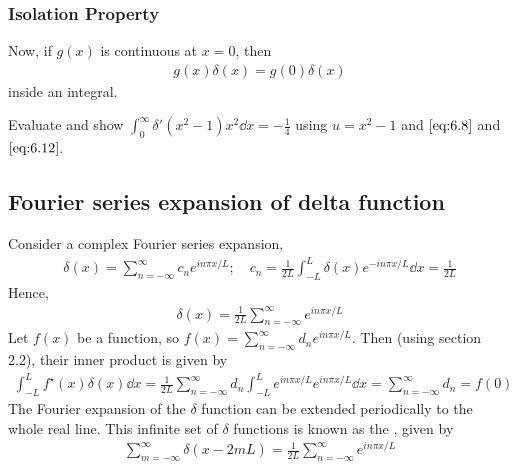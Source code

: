 \subsubsection{Isolation Property}
Now, if $g(x)$ is continuous at $x = 0$, then 
\begin{align}
	g(x) \delta(x) = g(0) \delta(x) \label{eq:6.13}
\end{align} 
inside an integral.

\begin{exercise}
	Evaluate and show $\int_{0}^{\infty} \delta'(x^2 - 1) x^2 \dd{x} = - \frac{1}{4}$ using $u = x^2 - 1$ and $\cref{eq:6.8}$ and $\cref{eq:6.12}$.
\end{exercise} 

\subsection{Fourier series expansion of delta function}
Consider a complex Fourier series expansion,
\begin{align*}
	\delta(x) = \sum_{n=-\infty}^\infty c_n e^{in\pi x/L};\quad c_n = \frac{1}{2L}\int_{-L}^L \delta(x) e^{-i n \pi x / L} \dd{x} = \frac{1}{2L}
\end{align*}
Hence,
\begin{align} \label{eq:6.14}
	\delta(x) = \frac{1}{2L} \sum_{n=-\infty}^\infty e^{in\pi x/L}
\end{align}
Let $f(x)$ be a function, so $f(x) = \sum_{n=-\infty}^\infty d_n e^{in \pi x / L}$.
Then (using section 2.2), their inner product is given by
\begin{align*}
	\int_{-L}^L f^\star(x) \delta(x) \dd{x} = \frac{1}{2L} \sum_{n = -\infty}^\infty d_n \int_{-L}^L e^{in \pi x/L} e^{in \pi x/L} \dd{x} = \sum_{n = -\infty}^\infty d_n = f(0)
\end{align*}
The Fourier expansion of the $\delta$ function can be extended periodically to the whole real line.
This infinite set of $\delta$ functions is known as the , given by
\begin{align*}
	\sum_{m = -\infty}^\infty \delta(x-2mL) = \frac{1}{2L} \sum_{n = -\infty}^\infty e^{in \pi x/L}
\end{align*}

